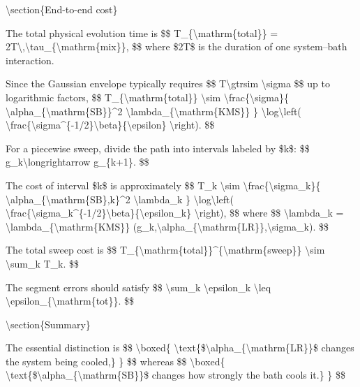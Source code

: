 {\textbackslash{}section\{End-to-end cost\}

The total physical evolution time is
\$\$
T\_\{\textbackslash{}mathrm\{total\}\}
=
2T\textbackslash{},\textbackslash{}tau\_\{\textbackslash{}mathrm\{mix\}\},
\$\$
where \$2T\$ is the duration of one system--bath interaction.

Since the Gaussian envelope typically requires
\$\$
T\textbackslash{}gtrsim \textbackslash{}sigma
\$\$
up to logarithmic factors,
\$\$
T\_\{\textbackslash{}mathrm\{total\}\}
\textbackslash{}sim
\textbackslash{}frac\{\textbackslash{}sigma\}\{
\textbackslash{}alpha\_\{\textbackslash{}mathrm\{SB\}\}\textasciicircum{}2
\textbackslash{}lambda\_\{\textbackslash{}mathrm\{KMS\}\}
\}
\textbackslash{}log\textbackslash{}left(
\textbackslash{}frac\{\textbackslash{}sigma\textasciicircum{}\{-1/2\}\textbackslash{}beta\}\{\textbackslash{}epsilon\}
\textbackslash{}right).
\$\$

For a piecewise sweep, divide the path into intervals labeled by \$k\$:
\$\$
g\_k\textbackslash{}longrightarrow g\_\{k+1\}.
\$\$

The cost of interval \$k\$ is approximately
\$\$
T\_k
\textbackslash{}sim
\textbackslash{}frac\{\textbackslash{}sigma\_k\}\{
\textbackslash{}alpha\_\{\textbackslash{}mathrm\{SB\},k\}\textasciicircum{}2
\textbackslash{}lambda\_k
\}
\textbackslash{}log\textbackslash{}left(
\textbackslash{}frac\{\textbackslash{}sigma\_k\textasciicircum{}\{-1/2\}\textbackslash{}beta\}\{\textbackslash{}epsilon\_k\}
\textbackslash{}right),
\$\$
where
\$\$
\textbackslash{}lambda\_k
=
\textbackslash{}lambda\_\{\textbackslash{}mathrm\{KMS\}\}
(g\_k,\textbackslash{}alpha\_\{\textbackslash{}mathrm\{LR\}\},\textbackslash{}sigma\_k).
\$\$

The total sweep cost is
\$\$
T\_\{\textbackslash{}mathrm\{total\}\}\textasciicircum{}\{\textbackslash{}mathrm\{sweep\}\}
\textbackslash{}sim
\textbackslash{}sum\_k T\_k.
\$\$

The segment errors should satisfy
\$\$
\textbackslash{}sum\_k \textbackslash{}epsilon\_k
\textbackslash{}leq
\textbackslash{}epsilon\_\{\textbackslash{}mathrm\{tot\}\}.
\$\$

\textbackslash{}section\{Summary\}

The essential distinction is
\$\$
\textbackslash{}boxed\{
\textbackslash{}text\{\$\textbackslash{}alpha\_\{\textbackslash{}mathrm\{LR\}\}\$ changes the system being cooled,\}
\}
\$\$
whereas
\$\$
\textbackslash{}boxed\{
\textbackslash{}text\{\$\textbackslash{}alpha\_\{\textbackslash{}mathrm\{SB\}\}\$ changes how strongly the bath cools it.\}
\}
\$\$

}
